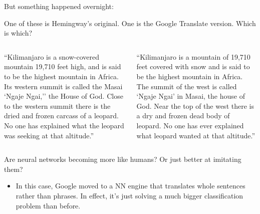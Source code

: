 \documentclass[mathserif, aspectratio=169]{beamer}
\begin{document}
\begin{frame}{But something happened overnight:}

One of these is Hemingway's original.  One is the Google Translate version.  Which is which?

\vspace{10mm}

\begin{columns}
	``Kilimanjaro is a snow-covered mountain 19,710 feet high, and is said to be the highest mountain in Africa. Its western summit is called the Masai `Ngaje Ngai,'' the House of God. Close to the western summit there is the dried and frozen carcass of a leopard. No one has explained what the leopard was seeking at that altitude.''


	``Kilimanjaro is a mountain of 19,710 feet covered with snow and is said to be the highest mountain in Africa. The summit of the west is called `Ngaje Ngai' in Masai, the house of God. Near the top of the west there is a dry and frozen dead body of leopard. No one has ever explained what leopard wanted at that altitude.''
\end{columns}

\pause
\vspace{10mm}
Are neural networks becoming more like humans?  Or just better at imitating them?
\begin{itemize}
	\item In this case, Google moved to a NN engine that translates whole sentences rather than phrases.  In effect, it's just solving a much bigger classification problem than before.  
\end{itemize}
\end{frame}
\end{document}
